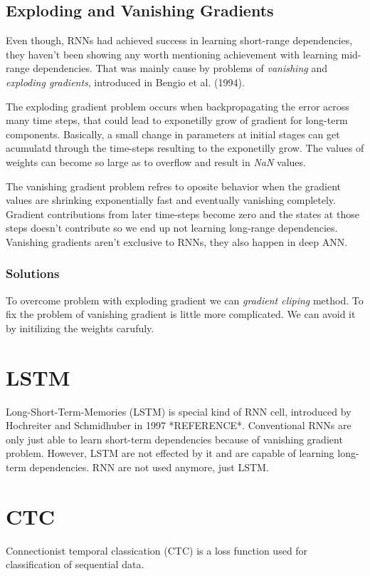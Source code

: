 \subsection{Exploding and Vanishing Gradients}

Even though, RNNs had achieved success in learning short-range dependencies, they haven’t been showing any worth mentioning achievement with learning mid-range dependencies.
That was mainly cause by problems of \textit{vanishing} and \textit{exploding gradients}, introduced in Bengio et al. (1994).

The exploding gradient problem occurs when backpropagating the error across many time steps, that could lead to exponetilly grow of gradient for long-term components.
Basically, a small change in parameters at initial stages can get acumulatd through the time-steps resulting to the exponetilly grow.
The values of weights can become so large as to overflow and result in \textit{NaN} values.

The vanishing gradient problem refres to oposite behavior when the gradient values are shrinking exponentially fast and eventually vanishing completely.
Gradient contributions from later time-steps become zero and the states at those steps doesn’t contribute so we end up not learning long-range dependencies.
Vanishing gradients aren’t exclusive to RNNs, they also happen in deep ANN.

\subsubsection{Solutions}

To overcome problem with exploding gradient we can \textit{gradient cliping} method.
To fix the problem of vanishing gradient is little more complicated.
We can avoid it by initilizing the weights carufuly.


\section{LSTM}

Long-Short-Term-Memories (LSTM) is special kind of RNN cell, introduced by Hochreiter and Schmidhuber in 1997 *REFERENCE*.
Conventional RNNs are only just able to learn short-term dependencies because of vanishing gradient problem.
However, LSTM are not effected by it and are capable of learning long-term dependencies.
RNN are not used anymore, just LSTM.



\section{CTC}

Connectionist temporal classication (CTC) is a loss function used for classification of sequential data.
